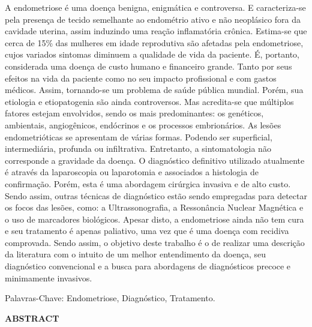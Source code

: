 \documentclass[12pt]{article} %
\begin{document}
A endometriose é uma doença benigna, enigmática e controversa. E
caracteriza-se pela presença de tecido semelhante ao endométrio ativo
e não neoplásico fora da cavidade uterina, assim induzindo uma reação
inflamatória crônica.
Estima-se que cerca de 15\% das mulheres em idade reprodutiva são
afetadas pela endometriose, cujos variados sintomas diminuem a
qualidade de vida da paciente. É, portanto, considerada uma doença de
custo humano e financeiro grande.  Tanto por seus efeitos na vida da
paciente como no seu impacto profissional e com gastos médicos.
Assim, tornando-se um problema de saúde pública mundial.
Porém, sua etiologia e etiopatogenia são ainda controversos. Mas
acredita-se que múltiplos fatores estejam envolvidos, sendo os mais
predominantes: os genéticos, ambientais, angiogênicos, endócrinos e
os processos embrionários.
As lesões endometrióticas se apresentam de várias formas. Podendo ser
superficial, intermediária, profunda ou infiltrativa. Entretanto, a
sintomatologia não corresponde a gravidade da doença. 
O diagnóstico definitivo utilizado atualmente é através da
laparoscopia ou laparotomia e associados a histologia de
confirmação. Porém, esta é uma abordagem cirúrgica invasiva e de alto
custo. Sendo assim, outras técnicas de diagnóstico estão sendo
empregadas para detectar os focos das lesões, como: a Ultrassonografia,
a Ressonância Nuclear Magnética e o uso de marcadores biológicos.
Apesar disto, a endometriose ainda não tem cura e seu tratamento é
apenas paliativo, uma vez que é uma doença com recidiva comprovada.
Sendo assim, o objetivo deste trabalho é o de realizar uma descrição
da literatura com o intuito de um melhor entendimento da doença, seu
diagnóstico convencional e a busca para abordagens de diagnósticos
precoce e minimamente invasivos.

Palavras-Chave: Endometriose, Diagnóstico, Tratamento.


\newpage
\begin{center}
\MakeUppercase{\textbf{Abstract}}
\end{center}
\end{document}

